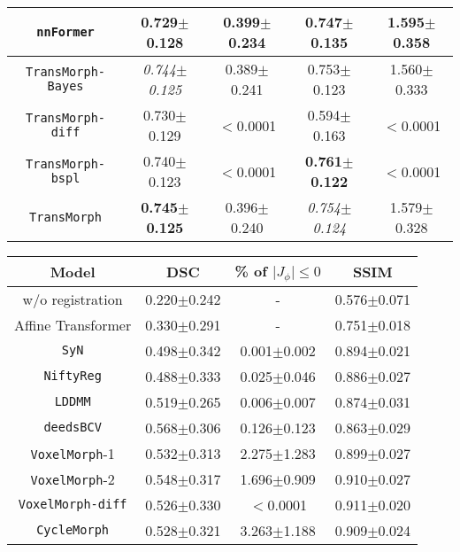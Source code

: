 \documentclass[times,twocolumn,final]{elsarticle}
\begin{document}
\begin{table*}[!t]
{\begin{tabular}{ c | c | c | c | c}
  \hline
 \texttt{nnFormer} & 0.729$\pm$0.128 & 0.399$\pm$0.234& 0.747$\pm$0.135& 1.595$\pm$0.358\\
 \hline
 \hline
 \texttt{TransMorph-Bayes} & \textit{0.744$\pm$0.125} & 0.389$\pm$0.241& 0.753$\pm$0.123& 1.560$\pm$0.333\\
 \hline
 \texttt{TransMorph-diff} & 0.730$\pm$0.129 & $<$0.0001& 0.594$\pm$0.163 & $<$0.0001\\
 \hline
 \texttt{TransMorph-bspl} & 0.740$\pm$0.123 & $<$0.0001& \textbf{0.761$\pm$0.122}& $<$0.0001\\
 \hline
 \texttt{TransMorph} & \textbf{0.745$\pm$0.125}& 0.396$\pm$0.240& \textit{0.754$\pm$0.124}& 1.579$\pm$0.328\\
 \hline
\end{tabular}
\label{tab:table_res}}
\quad
\fontsize{7.5}{9}\selectfont
\parbox{0.5\linewidth}{
\centering
\caption{Quantitative evaluation results of XCAT-to-CT registration. Dice score of 16 organs, percentage of voxels with a non-positive Jacobian determinant (i.e., folded voxels), and SSIM are evaluated for different methods. The \textbf{bolded} numbers denote the highest scores, while the \textit{italicized} ones indicate the second highest.}
\label{tab:table_res_XCAT}
\begin{tabular}{ c | c | c | c }
 \hline
 Model & DSC & \% of $\vert J_{\phi}\vert\leq0$ & SSIM\\\hline
 w/o registration & 0.220$\pm$0.242 & - & 0.576$\pm$0.071 \\
 \hline
 Affine Transformer & 0.330$\pm$0.291 & - & 0.751$\pm$0.018 \\
 \hline
 \texttt{SyN}& 0.498$\pm$0.342 & 0.001$\pm$0.002 & 0.894$\pm$0.021 \\\hline
 \texttt{NiftyReg}& 0.488$\pm$0.333 & 0.025$\pm$0.046 & 0.886$\pm$0.027\\\hline
 \texttt{LDDMM} & 0.519$\pm$0.265 & 0.006$\pm$0.007 & 0.874$\pm$0.031\\\hline
 \texttt{deedsBCV}& 0.568$\pm$0.306 & 0.126$\pm$0.123 & 0.863$\pm$0.029\\\hline
 \texttt{VoxelMorph}-1 & 0.532$\pm$0.313 & 2.275$\pm$1.283 & 0.899$\pm$0.027\\\hline
 \texttt{VoxelMorph}-2 & 0.548$\pm$0.317 & 1.696$\pm$0.909  & 0.910$\pm$0.027\\\hline
 \texttt{VoxelMorph-diff} & 0.526$\pm$0.330 & $<$0.0001  & 0.911$\pm$0.020\\\hline
 \texttt{CycleMorph} & 0.528$\pm$0.321 & 3.263$\pm$1.188  & 0.909$\pm$0.024\\\hline

\end{tabular}}
\end{table*}
\end{document}
